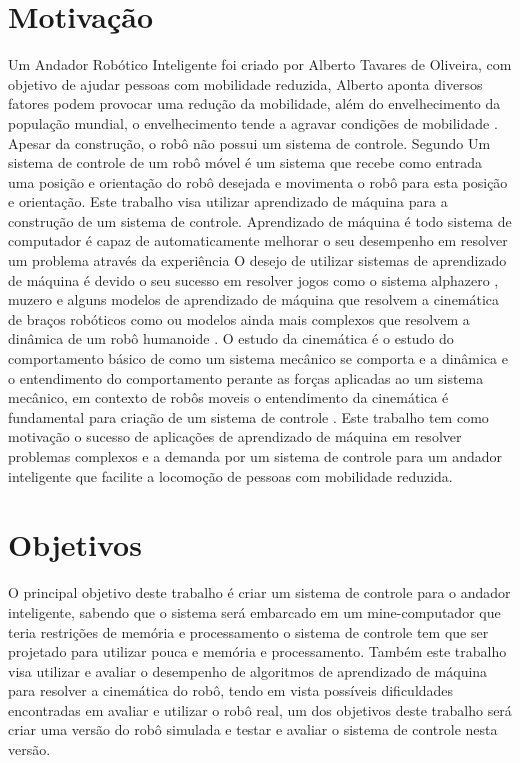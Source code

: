 \label{Cap:Introducao}

\section{Motivação}

Um Andador Robótico Inteligente foi criado por Alberto Tavares de Oliveira,
com objetivo de ajudar pessoas com mobilidade reduzida, Alberto aponta
diversos fatores podem provocar uma redução da mobilidade, além do 
envelhecimento da população mundial, o envelhecimento tende a agravar
condições de mobilidade \cite{oliveira2022projeto}. Apesar da construção,
o robô não possui um sistema de controle. Segundo \cite{siegwart2011introduction}
Um sistema de controle de um robô móvel é um sistema que recebe
como entrada uma posição e orientação do robô desejada e movimenta o robô
para esta posição e orientação. Este trabalho visa utilizar
aprendizado de máquina para a construção de um sistema de controle.
Aprendizado de máquina é todo sistema de computador é capaz de
automaticamente melhorar o seu desempenho em resolver um problema através
da experiência \cite{mitchell1990machine}
O desejo de utilizar sistemas de aprendizado de máquina é devido o seu sucesso em
resolver jogos como o sistema alphazero \cite{silver2017mastering}, muzero
\cite{schrittwieser2020mastering} e alguns modelos de aprendizado de máquina
que resolvem a cinemática de braços robóticos como \cite{cavalcanti2017self}
ou modelos ainda mais complexos que resolvem a dinâmica de um robô humanoide
\cite{phaniteja2017deep}. O estudo da cinemática é o estudo do comportamento
básico de como um sistema mecânico se comporta e a dinâmica e o entendimento
do comportamento perante as forças aplicadas ao um sistema mecânico, em contexto
de robôs moveis o entendimento da cinemática é fundamental para criação de um
sistema de controle \cite{siegwart2011introduction}. Este trabalho tem como
motivação o sucesso de aplicações de aprendizado de máquina em resolver problemas
complexos e a demanda por um sistema de controle para um andador
inteligente que facilite a locomoção de pessoas com mobilidade reduzida. 

\section{Objetivos}

O principal objetivo deste trabalho é criar um  sistema de
controle para o andador inteligente, sabendo que o sistema será
embarcado em um mine-computador que teria restrições de memória e
processamento o sistema de controle tem que ser projetado para utilizar
pouca e memória e processamento.
Também este trabalho visa utilizar e avaliar o desempenho de algoritmos
de aprendizado de máquina para resolver a cinemática do robô, tendo em
vista possíveis dificuldades encontradas em avaliar e utilizar o robô real,
um dos objetivos deste trabalho será criar uma versão do robô simulada e
testar e avaliar o sistema de controle nesta versão.

